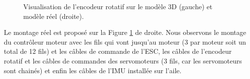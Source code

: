\begin{figure}[ht!]
    \centering
    \caption{Visualisation de l'encodeur rotatif sur le modèle 3D (gauche) et modèle réel (droite).}
    \label{fig:ColibriRotReel}
\end{figure}
Le montage réel est proposé sur la Figure \ref{fig:ColibriRotReel} de droite. Nous observons le montage du contrôleur moteur avec les fils qui vont jusqu'au moteur (3 par moteur soit un total de 12 fils) et les câbles de commande de l'ESC, les câbles de l'encodeur rotatif et les câbles de commandes des servomoteurs (3 fils, car les servomoteurs sont chainés) et enfin les câbles de l'IMU installée sur l'aile.


